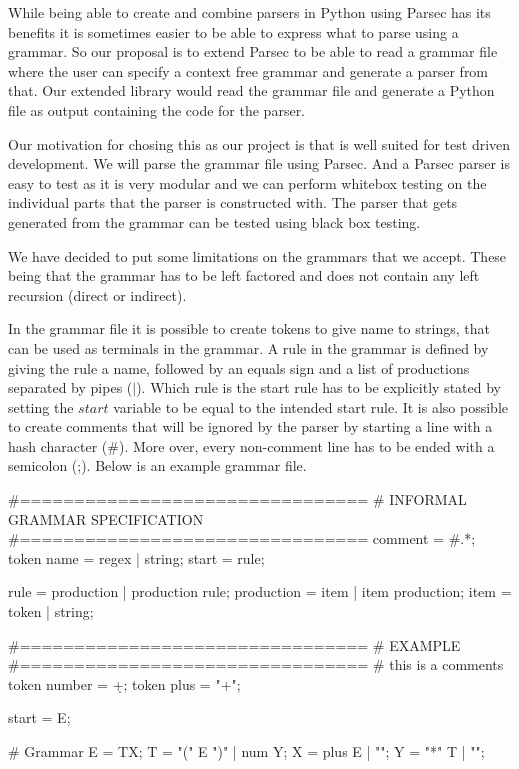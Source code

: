 While being able to create and combine parsers in Python using Parsec has its benefits it is sometimes easier to be able to express what to parse using a grammar. So our proposal is to extend Parsec to be able to read a grammar file where the user can specify a context free grammar and generate a parser from that. Our extended library would read the grammar file and generate a Python file as output containing the code for the parser.\par
Our motivation for chosing this as our project is that is well suited for test driven development. We will parse the grammar file using Parsec. And a Parsec parser is easy to test as it is very modular and we can perform whitebox testing on the individual parts that the parser is constructed with. The parser that gets generated from the grammar can be tested using black box testing.\par
We have decided to put some limitations on the grammars that we accept. These being that the grammar has to be left factored and does not contain any left recursion (direct or indirect).\par
In the grammar file it is possible to create tokens to give name to strings, that can be used as terminals in the grammar. A rule in the grammar is defined by giving the rule a name, followed by an equals sign and a list of productions separated by pipes ($\vert$). Which rule is the start rule has to be explicitly stated by setting the $start$ variable to be equal to the intended start rule. It is also possible to create comments that will be ignored by the parser by starting a line with a hash character (\#). More over, every non-comment line has to be ended with a semicolon (;). Below is an example grammar file.
\begin{python}
#================================
# INFORMAL GRAMMAR SPECIFICATION
#================================
comment = #.*\n;
token name = regex | string;
start = rule;

rule = production | production rule;
production = item | item production;
item = token | string;

#================================
# EXAMPLE
#================================
# this is a comments
token number = \d+;
token plus = "+";

start = E;

# Grammar
E = TX;
T = "(" E ")" | num Y;
X = plus E | "";
Y = "*" T  | "";
\end{python}
